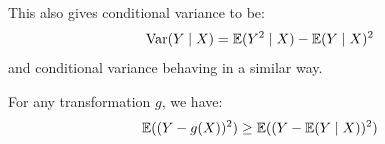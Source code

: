 This also gives conditional variance to be:
$$\text{Var}(Y \mid X) = \mathbb{E}(Y^2 \mid X) - \mathbb{E}(Y \mid X)^2$$
and conditional variance behaving in a similar way.
\begin{lemma}
    For any transformation $g$, we have:
    $$\mathbb{E}((Y - g(X))^2) \ge \mathbb{E}((Y - \mathbb{E}(Y \mid X))^2)$$
\end{lemma}


\newpage